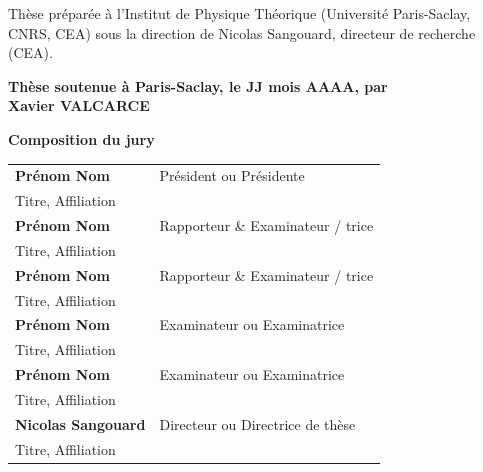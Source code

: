 \documentclass[french,12pt,a4paper]{book}
\begin{document}
\begin{titlepage}
		\footnotesize Thèse préparée à l’Institut de Physique Théorique (Université Paris-Saclay, CNRS, CEA) sous la direction de Nicolas Sangouard, directeur de recherche (CEA). \\
		\vspace{15mm}
		
		\textbf{Thèse soutenue à Paris-Saclay, le JJ mois AAAA, par}\\
		\bigskip
		\Large {\color{Prune} \textbf{Xavier VALCARCE}}
		
		\vspace{\fill} %
		
		\bigskip
		
		\flushleft
		\small \textbf{Composition du jury}\\
		\vspace{2mm}
		\scriptsize
		\begin{tabular}{|p{7cm}l}
			\arrayrulecolor{Prune}
			\textbf{Prénom Nom} &   Président ou Présidente\\ 
			Titre, Affiliation & \\
			\textbf{Prénom Nom} &  Rapporteur \& Examinateur / trice \\ 
			Titre, Affiliation   &   \\ 
			\textbf{Prénom Nom} &  Rapporteur \& Examinateur / trice \\ 
			Titre, Affiliation  &   \\ 
			\textbf{Prénom Nom} &  Examinateur ou Examinatrice \\ 
			Titre, Affiliation   &   \\ 
			\textbf{Prénom Nom} &  Examinateur ou Examinatrice \\ 
			Titre, Affiliation   &   \\ 
			\textbf{Nicolas Sangouard} &  Directeur ou Directrice de thèse \\ 
			Titre, Affiliation   &   \\ 
			
		\end{tabular} 
		
	\end{titlepage}

\Ifthispageodd{\newpage\thispagestyle{empty}\null\newpage}{}
\thispagestyle{empty}
\selectfont

\lhead{}
\rhead{}
\rfoot{}
\cfoot{}
\lfoot{}
\end{document}

